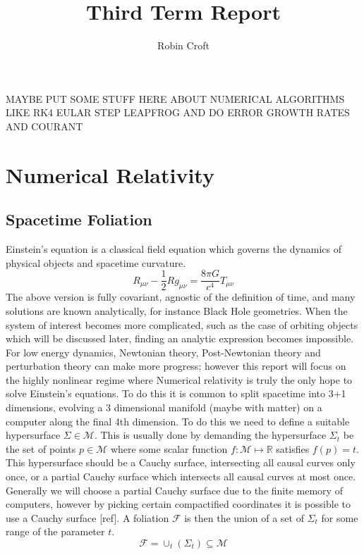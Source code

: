 \documentclass[11pt, oneside]{report}  %
\title{Third Term Report}
\author{Robin Croft}
\newcommand{\M}{\mathcal{M}}
\numberwithin{equation}{section}
\begin{document}
\tableofcontents
\newpage





MAYBE PUT SOME STUFF HERE ABOUT NUMERICAL ALGORITHMS LIKE RK4 EULAR STEP LEAPFROG AND DO ERROR GROWTH RATES AND COURANT


\section{Numerical Relativity}
\subsection{Spacetime Foliation}
Einstein's equation is a classical field equation which governs the dynamics of physical objects and spacetime curvature. 
\begin{equation}R_{\mu\nu} - \frac{1}{2} Rg_{\mu\nu} = \frac{8\pi G}{c^4}T_{\mu\nu}\end{equation}
The above version is fully covariant, agnostic of the definition of time, and many solutions are known analytically, for instance Black Hole geometries. When the system of interest becomes more complicated, such as the case of orbiting objects which will be discussed later, finding an analytic expression becomes impossible. For low energy dynamics, Newtonian theory, Post-Newtonian theory and perturbation theory can make more progress; however this report will focus on the highly nonlinear regime where Numerical relativity is truly the only hope to solve Einstein's equations. To do this it is common to split spacetime into 3+1 dimensions, evolving a 3 dimensional manifold (maybe with matter) on a computer along the final 4th dimension. To do this we need to define a suitable hypersurface $\Sigma \in \M$. This is usually done by demanding the hypersurface $\Sigma_t$ be the set of points $p \in \M$ where some scalar function $f:\M\mapsto \mathbb{R}$ satisfies $f(p)=t$. This hypersurface should be a Cauchy surface, intersecting all causal curves only once, or a partial Cauchy surface which intersects all causal curves at most once. Generally we will choose a partial Cauchy surface due to the finite memory of computers, however by picking certain compactified coordinates it is possible to use a Cauchy surface [ref]. A foliation $\mathcal{F}$ is then the union of a set of $\Sigma_t$ for some range of the parameter $t$.
\begin{equation}\mathcal{F} = \cup_t(\Sigma_t) \subseteq \M\end{equation}
\end{document}
